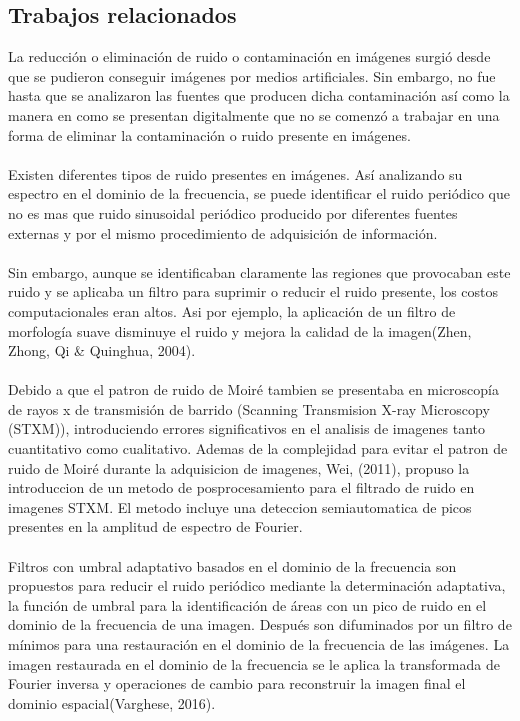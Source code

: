 \documentclass[10pt,letterpaper]{article}
\begin{document}
\subsection{Trabajos relacionados}
La reducción o eliminación de ruido o contaminación en imágenes surgió desde que se pudieron conseguir imágenes por medios artificiales. Sin embargo, no fue hasta que se analizaron las fuentes que producen dicha contaminación así como la manera en como se presentan digitalmente que no se comenzó a trabajar en una forma de eliminar la contaminación o ruido presente en imágenes. 
\\\\
Existen diferentes tipos de ruido presentes en imágenes. Así analizando su espectro en el dominio de la frecuencia, se puede identificar el ruido periódico que no es mas que ruido sinusoidal periódico producido por  diferentes fuentes externas y por el mismo procedimiento de adquisición de información. 
\\\\
Sin embargo, aunque se identificaban claramente las regiones que provocaban este ruido y se aplicaba un filtro para suprimir o reducir el ruido presente, los costos computacionales eran altos. Asi por ejemplo, la aplicación de un filtro de morfología suave disminuye el ruido y mejora la calidad de la imagen(Zhen, Zhong, Qi \& Quinghua, 2004)\cite{Zhen:Ming}.
\\\\
Debido a que el patron de ruido de Moiré tambien se presentaba en microscopía de rayos x de transmisión de barrido (Scanning Transmision X-ray Microscopy (STXM)), introduciendo errores significativos en el analisis de imagenes tanto cuantitativo como cualitativo. Ademas de la complejidad para evitar el patron de ruido de Moiré durante la adquisicion de imagenes,  Wei, (2011)\cite{Wei:Wang}, propuso la introduccion de un metodo de  posprocesamiento para el filtrado de ruido en imagenes STXM. El metodo incluye una deteccion semiautomatica de picos presentes en la amplitud de espectro de Fourier\cite{cite2}.  
\\\\
Filtros con umbral adaptativo basados en el dominio de la frecuencia son propuestos para reducir el ruido periódico mediante la determinación adaptativa, la función de umbral para la identificación de áreas con un pico de ruido en el dominio de la frecuencia de una imagen. Después son difuminados por un filtro de mínimos para una restauración en el dominio de la frecuencia de las imágenes. La imagen restaurada en el dominio de la frecuencia se le aplica la transformada de Fourier inversa y operaciones de cambio para reconstruir la imagen final el dominio espacial(Varghese, 2016)\cite{Varghese:}.
\end{document}

